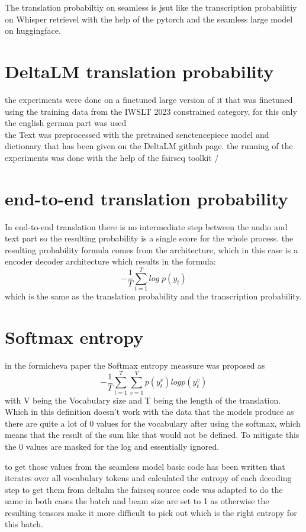 The translation probabiltiy on seamless is jsut like the transcription probabilitiy on Whisper retrievel with the help of the pytorch and the seamless large model on huggingface. 


\section{DeltaLM translation probability}
the experiments \cite{ma2021deltalm} were done on a finetuned large version of it that was finetuned using the training data from the IWSLT 2023 constrained category, for this only the english german part was used
\\
the Text was preprocessed with the pretrained senctencepiece model and dictionary that has been given on the DeltaLM github page. 
the running of the experiments was done with the help of the fairseq toolkit \cite{ott2019fairseqfastextensibletoolkit}/\cite{ott2019fairseq}

\section{end-to-end translation probability}
In end-to-end translation there is no intermediate step between the audio and text part so the resulting probability is a single score for the whole process.
the resulting probability formula comes from the architecture, which in this case is a encoder decoder architecture which results in the formula: $$-\frac{1}{T}\sum_{t=1}^T log\; p(y_t)$$ which is the same as the translation probability and the transcription probability. 

\section{Softmax entropy}
in the formicheva \cite{fomicheva2020unsupervised} paper the Softmax entropy meassure was proposed as $$-\frac{1}{T}\sum_{t=1}^T\sum_{v=1}^Vp(y_t^v)logp(y_t^v) \label{formula:translation probability}$$ with V being the Vocabulary size and T being the length of the translation. Which in this definition doesn't work with the data that the models produce as there are quite a lot of 0 values for the vocabulary after using the softmax, which means that the result of the sum like that would not be defined. To mitigate this the 0 values are masked for the log and essentially ignored. 

to get those values from the seamless model basic code has been written that iterates over all vocabulary tokens and calculated the entropy of each decoding step
to get them from deltalm the fairseq source code was adapted to do the same
in both cases the batch and beam size are set to 1 as otherwise the resulting tensors make it more difficult to pick out which is the right entropy for this batch. 

